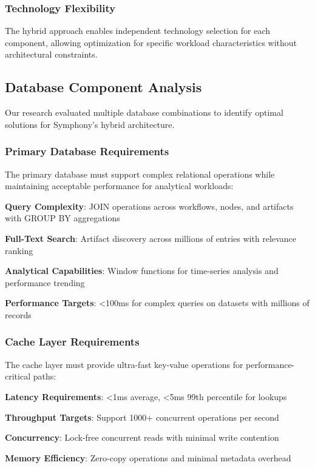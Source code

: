 \subsubsection*{Technology Flexibility}

The hybrid approach enables independent technology selection for each component, allowing optimization for specific workload characteristics without architectural constraints.

\subsection*{Database Component Analysis}

Our research evaluated multiple database combinations to identify optimal solutions for Symphony's hybrid architecture.

\subsubsection*{Primary Database Requirements}

The primary database must support complex relational operations while maintaining acceptable performance for analytical workloads:

\begin{expandedlist}
    \item \textbf{Query Complexity}: JOIN operations across workflows, nodes, and artifacts with GROUP BY aggregations
    \item \textbf{Full-Text Search}: Artifact discovery across millions of entries with relevance ranking
    \item \textbf{Analytical Capabilities}: Window functions for time-series analysis and performance trending
    \item \textbf{Performance Targets}: <100ms for complex queries on datasets with millions of records
\end{expandedlist}

\subsubsection*{Cache Layer Requirements}

The cache layer must provide ultra-fast key-value operations for performance-critical paths:

\begin{compactlist}
    \item \textbf{Latency Requirements}: <1ms average, <5ms 99th percentile for lookups
    \item \textbf{Throughput Targets}: Support 1000+ concurrent operations per second
    \item \textbf{Concurrency}: Lock-free concurrent reads with minimal write contention
    \item \textbf{Memory Efficiency}: Zero-copy operations and minimal metadata overhead
\end{compactlist}

